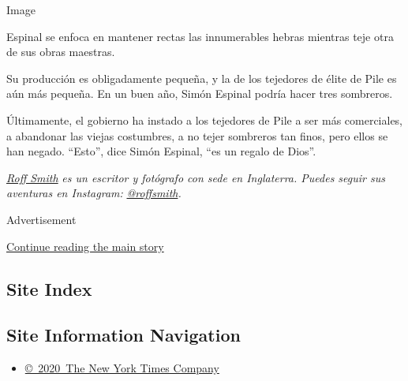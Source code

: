Image

Espinal se enfoca en mantener rectas las innumerables hebras mientras
teje otra de sus obras maestras.

Su producción es obligadamente pequeña, y la de los tejedores de élite
de Pile es aún más pequeña. En un buen año, Simón Espinal podría hacer
tres sombreros.

Últimamente, el gobierno ha instado a los tejedores de Pile a ser más
comerciales, a abandonar las viejas costumbres, a no tejer sombreros tan
finos, pero ellos se han negado. ``Esto'', dice Simón Espinal, ``es un
regalo de Dios''.

\href{http://www.roffsmithphotography.com/}{\emph{Roff Smith}} \emph{es
un escritor y fotógrafo con sede en Inglaterra. Puedes seguir sus
aventuras en Instagram:}
\href{https://www.instagram.com/roffsmith/}{\emph{@roffsmith}}\emph{.}

Advertisement

\protect\hyperlink{after-bottom}{Continue reading the main story}

\hypertarget{site-index}{%
\subsection{Site Index}\label{site-index}}

\hypertarget{site-information-navigation}{%
\subsection{Site Information
Navigation}\label{site-information-navigation}}

\begin{itemize}
\tightlist
\item
  \href{https://help.nytimes.com/hc/en-us/articles/115014792127-Copyright-notice}{©~2020~The
  New York Times Company}
\end{itemize}

